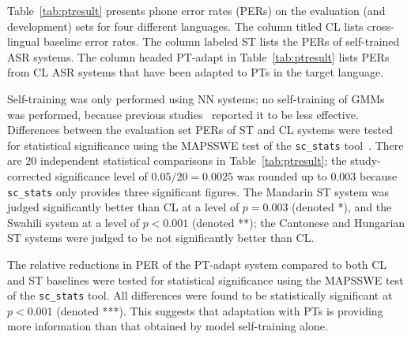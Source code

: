 
Table~\ref{tab:ptresult} presents phone error rates (PERs) on the
evaluation (and development) sets for four different languages. The
column titled {\sc CL} lists cross-lingual baseline error rates.
The column labeled {\sc ST} lists the
PERs of self-trained ASR systems.
The column headed {\sc PT-adapt} in Table~\ref{tab:ptresult} lists
PERs from {\sc CL} ASR systems that have been adapted to PTs in the target
language.

Self-training was only performed
using NN systems; no self-training of GMMs was performed, because
previous studies~\cite{Huang2013} reported it to be less effective.
Differences between the evaluation set PERs of {\sc ST} and {\sc CL}
systems were tested for statistical significance using the MAPSSWE
test of the {\tt sc\_stats} tool~\cite{Pallet90}.  There are 20
independent statistical comparisons in Table~\ref{tab:ptresult}; the
study-corrected significance level of $0.05/20=0.0025$ was rounded up
to $0.003$ because {\tt sc\_stats} only provides three significant
figures.  The Mandarin {\sc ST} system was judged significantly better
than {\sc CL} at a level of $p=0.003$ (denoted *), and the Swahili
system at a level of $p<0.001$ (denoted **); the Cantonese and
Hungarian {\sc ST} systems were judged to be not significantly better
than {\sc CL}.

The relative reductions in PER
of the {\sc PT-adapt} system
compared to both {\sc CL} and {\sc ST} baselines
were tested for statistical significance using the MAPSSWE test of the
{\tt sc\_stats} tool.  All differences were found to be statistically
significant at $p<0.001$ (denoted ***).  This suggests that adaptation
with PTs is providing more information than that obtained by model
self-training alone.

